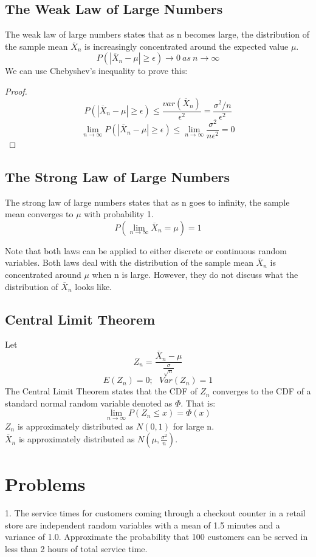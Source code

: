 \documentclass[11pt]{article}
\begin{document}
\subsection{The Weak Law of Large Numbers}
The weak law of large numbers states that as n becomes large, the distribution of the sample mean $\overline{X}_n$ is increasingly concentrated around the expected value $\mu$.
$$P(|\overline{X}_n - \mu| \geq \epsilon) \to 0 \: as \: n \to \infty$$
We can use Chebyshev's inequality to prove this:
\begin{proof}
  $$P(|\overline{X}_n - \mu| \geq \epsilon) \leq \frac{var(\overline{X}_n)}{\epsilon^2} = \frac{\sigma^2/n}{\epsilon^2} $$
  $$ \lim_{n \to \infty}P(|\overline{X}_n - \mu| \geq \epsilon) \leq \lim_{n \to \infty}\frac{\sigma^2}{n\epsilon^2} = 0$$
\end{proof}

\subsection{The Strong Law of Large Numbers}
The strong law of large numbers states that as n goes to infinity, the sample mean converges to $\mu$ with probability 1.
$$P(\lim_{n \to \infty} \overline{X}_n = \mu) = 1$$

Note that both laws can be applied to either discrete or continuous random variables.
Both laws deal with the distribution of the sample mean $\overline{X}_n$ is concentrated around $\mu$ when n is large.
However, they do not discuss what the distribution of $\overline{X}_n$ looks like. 

\subsection{Central Limit Theorem}
Let 
$$Z_n = \frac{\overline{X}_n - \mu}{\frac{\sigma}{\sqrt{n}}}$$
$$E(Z_n) = 0; \:\:\: Var(Z_n) = 1$$
The Central Limit Theorem states that the CDF of $Z_n$ converges to the CDF of a standard normal random variable denoted as $\Phi$.
That is: $$ \lim_{n \to \infty} P(Z_n \leq x) = \Phi(x)$$
$Z_n$ is approximately distributed as $N(0,1)$ for large n. \\
$\overline{X}_n$ is approximately distributed as $N(\mu, \frac{\sigma^2}{n})$.

\section{Problems}
1. The service times for customers coming through a checkout counter in a retail store are independent random variables with a mean of 1.5 minutes and a variance of 1.0.
Approximate the probability that 100 customers can be served in less than 2 hours of total service time.
\end{document}
